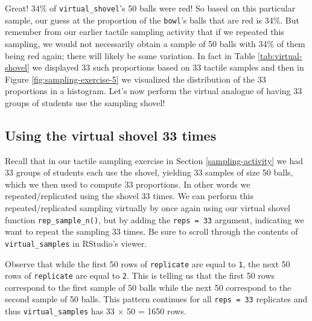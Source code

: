 \documentclass[12pt, krantz2,]{krantz}
\makeatletter
\newenvironment{Shaded}{\begin{snugshade}}{\end{snugshade}}
\newcommand{\DataTypeTok}[1]{\textcolor[rgb]{0.27,0.27,0.27}{#1}}
\newcommand{\DecValTok}[1]{\textcolor[rgb]{0.06,0.06,0.06}{#1}}
\newcommand{\KeywordTok}[1]{\textcolor[rgb]{0.27,0.27,0.27}{\textbf{#1}}}
\newcommand{\NormalTok}[1]{#1}
\newcommand{\OperatorTok}[1]{\textcolor[rgb]{0.43,0.43,0.43}{\textbf{#1}}}
\newcommand{\StringTok}[1]{\textcolor[rgb]{0.5,0.5,0.5}{#1}}
\newenvironment{kframe}{%
\medskip{}
\setlength{\fboxsep}{.8em}
 \def\at@end@of@kframe{}%
 \ifinner\ifhmode%
  \def\at@end@of@kframe{\end{minipage}}%
  \begin{minipage}{\columnwidth}%
 \fi\fi%
 \def\FrameCommand##1{\hskip\@totalleftmargin \hskip-\fboxsep
 \colorbox{shadecolor}{##1}\hskip-\fboxsep
     \hskip-\linewidth \hskip-\@totalleftmargin \hskip\columnwidth}%
 \MakeFramed {\advance\hsize-\width
   \@totalleftmargin\z@ \linewidth\hsize
   \@setminipage}}%
 {\par\unskip\endMakeFramed%
 \at@end@of@kframe}
\renewenvironment{Shaded}{\begin{kframe}}{\end{kframe}}
\makeatother
\begin{document}
Great! 34\% of \texttt{virtual\_shovel}'s 50 balls were red! So based on this particular sample, our guess at the proportion of the \texttt{bowl}'s balls that are red is 34\%. But remember from our earlier tactile sampling activity that if we repeated this sampling, we would not necessarily obtain a sample of 50 balls with 34\% of them being red again; there will likely be some variation. In fact in Table \ref{tab:virtual-shovel} we displayed 33 such proportions based on 33 tactile samples and then in Figure \ref{fig:sampling-exercise-5} we visualized the distribution of the 33 proportions in a histogram. Let's now perform the virtual analogue of having 33 groups of students use the sampling shovel!

\hypertarget{using-the-virtual-shovel-33-times}{%
\subsection{Using the virtual shovel 33 times}\label{using-the-virtual-shovel-33-times}}

Recall that in our tactile sampling exercise in Section \ref{sampling-activity} we had 33 groups of students each use the shovel, yielding 33 samples of size 50 balls, which we then used to compute 33 proportions. In other words we repeated/replicated using the shovel 33 times. We can perform this repeated/replicated sampling virtually by once again using our virtual shovel function \texttt{rep\_sample\_n()}, but by adding the \texttt{reps\ =\ 33} argument, indicating we want to repeat the sampling 33 times. Be sure to scroll through the contents of \texttt{virtual\_samples} in RStudio's viewer.

\begin{Shaded}
\end{Shaded}

Observe that while the first 50 rows of \texttt{replicate} are equal to \texttt{1}, the next 50 rows of \texttt{replicate} are equal to \texttt{2}. This is telling us that the first 50 rows correspond to the first sample of 50 balls while the next 50 correspond to the second sample of 50 balls. This pattern continues for all \texttt{reps\ =\ 33} replicates and thus \texttt{virtual\_samples} has 33 \(\times\) 50 = 1650 rows.
\end{document}
